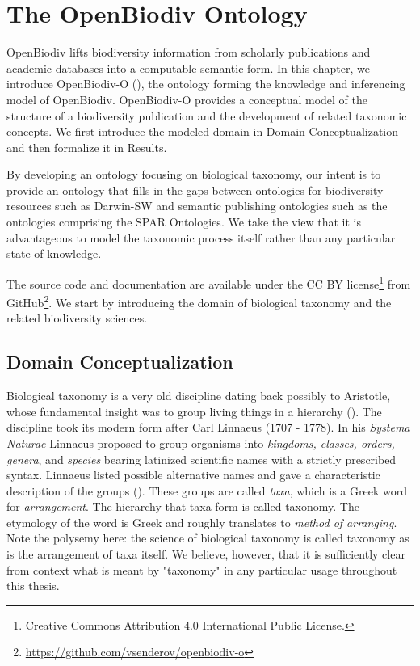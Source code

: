 \chapter{The OpenBiodiv Ontology}

\label{chapter-ontology}

OpenBiodiv lifts biodiversity information from scholarly publications and academic databases into a computable semantic form.  In this chapter, we introduce OpenBiodiv-O (\cite{senderov_openbiodiv-o:_2018}), the ontology forming the knowledge and inferencing model of OpenBiodiv. OpenBiodiv-O provides a conceptual model of the structure of a biodiversity publication and the development of related taxonomic concepts. We first introduce the modeled domain in Domain Conceptualization and then formalize it in Results. 

By developing an ontology focusing on biological taxonomy, our intent is to provide an ontology that fills in the gaps between ontologies for biodiversity resources such as Darwin-SW and semantic publishing ontologies such as the ontologies comprising the SPAR Ontologies. We take the view that it is advantageous to model the taxonomic process itself rather than any particular state of knowledge.

The source code and documentation are available under the CC BY license\footnote{Creative Commons Attribution 4.0 International Public License.} from GitHub\footnote{\href{https://github.com/vsenderov/openbiodiv-o/blob/master/LICENSE.md}{https://github.com/vsenderov/openbiodiv-o}}. We start by introducing the domain of biological taxonomy and the related biodiversity sciences.

\section{Domain Conceptualization}

Biological taxonomy is a very old discipline dating back possibly to Aristotle, whose fundamental insight was to group living things in a hierarchy (\cite{manktelow_history_2010}). The discipline took its modern form after Carl Linnaeus (1707 - 1778). In his \emph{Systema Naturae} Linnaeus proposed to group organisms into \emph{kingdoms, classes, orders, genera}, and \emph{species} bearing latinized scientific names with a strictly prescribed syntax. Linnaeus listed possible alternative names and gave a characteristic description of the groups (\cite{linnaeus_systema_1758}). These groups are called \emph{taxa}, which is a Greek word for \emph{arrangement}. The hierarchy that taxa form is called taxonomy. The etymology of the word is Greek and roughly translates to \emph{method of arranging}. Note the polysemy here: the science of biological taxonomy is called taxonomy as is the arrangement of taxa itself. We believe, however, that it is sufficiently clear from context what is meant by "taxonomy" in any particular usage throughout this thesis.

